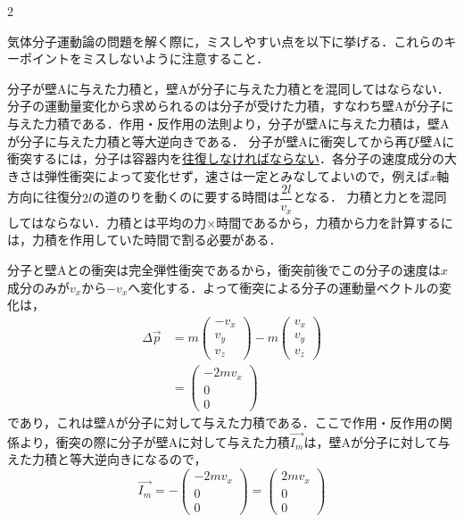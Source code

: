 \begin{multicols}{2}
\par\nopagebreak
\begin{sisin}
気体分子運動論の問題を解く際に，ミスしやすい点を以下に挙げる．これらのキーポイントをミスしないように注意すること．
\begin{komon}
 分子が壁$\mathrm{A}$に与えた力積と，壁$\mathrm{A}$が分子に与えた力積とを混同してはならない．分子の運動量変化から求められるのは分子が受けた力積，すなわち壁$\mathrm{A}$が分子に与えた力積である．作用・反作用の法則より，分子が壁$\mathrm{A}$に与えた力積は，壁$\mathrm{A}$が分子に与えた力積と等大逆向きである．
 分子が壁$\mathrm{A}$に衝突してから再び壁$\mathrm{A}$に衝突するには，分子は容器内を\underline{往復し}\hskip0pt\underline{なけれ}\hskip0pt\underline{ばなら}\hskip0pt\underline{ない}．各分子の速度成分の大きさは弾性衝突によって変化せず，速さは一定とみなしてよいので，例えば$x$軸方向に往復分$2l$の道のりを動くのに要する時間は$\dfrac{2l}{v_x}$となる．
 力積と力とを混同してはならない．力積とは平均の力$\times$時間であるから，力積から力を計算するには，力積を作用していた時間で割る必要がある．
\end{komon}
\end{sisin}
\KaiHead
\begin{komon}
 分子と壁$\mathrm{A}$との衝突は完全弾性衝突であるから，衝突前後でこの分子の速度は$x$成分のみが$v_x$から$-v_x$へ変化する．よって衝突による分子の運動量ベクトルの変化は，
       \[\begin{aligned}
         \Delta\overrightarrow{p}&=m\begin{pmatrix}-v_x\\ v_y\\ v_z\end{pmatrix}-m\begin{pmatrix}v_x\\ v_y\\ v_z\end{pmatrix}\\[1mm]
         &=\begin{pmatrix}-2mv_x\\ 0\\ 0\end{pmatrix}
       \end{aligned}\]
       であり，これは壁$\mathrm{A}$が分子に対して与えた力積である．ここで作用・反作用の関係より，衝突の際に分子が壁$\mathrm{A}$に対して与えた力積$\overrightarrow{I_m}$は，壁$\mathrm{A}$が分子に対して与えた力積と等大逆向きになるので，
       \[\overrightarrow{I_m}=-\begin{pmatrix}-2mv_x\\ 0\\ 0\end{pmatrix}=\begin{pmatrix}2mv_x\\ 0\\ 0\end{pmatrix}\]

\end{komon}
\end{multicols}
